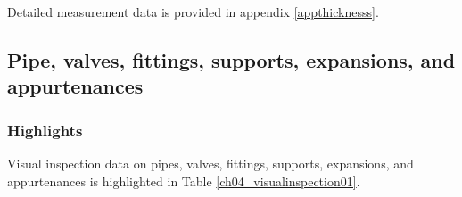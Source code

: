 Detailed measurement data is provided in appendix \ref{appthicknesss}.
\subsection{Pipe, valves, fittings, supports, expansions, and appurtenances} \label{ch04mech02}

\subsubsection{Highlights}

Visual inspection data on pipes, valves, fittings, supports, expansions, and appurtenances is highlighted in Table \ref{ch04_visualinspection01}.

